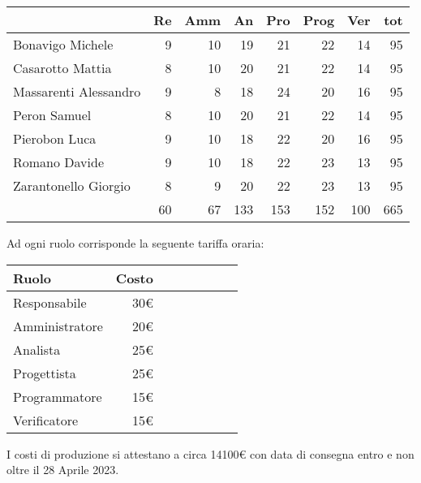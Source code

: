\begin{table}[H]
    \begin{tabularx}{\linewidth}{X|rrrrrrr}
    \rowcolor{gray!30}& Re & Amm & An & Pro & Prog & Ver & tot \\
    \hline
    Bonavigo Michele                        & 9 & 10 & 19 & 21 & 22 & 14 & 95 \\
    \rowcolor{gray!10}Casarotto Mattia      & 8 & 10 & 20 & 21 & 22 & 14 & 95 \\
    Massarenti Alessandro                   & 9 & 8 & 18 & 24 & 20 & 16 & 95 \\
    \rowcolor{gray!10}Peron Samuel          & 8 & 10 & 20 & 21 & 22 & 14 & 95 \\
    Pierobon Luca                           & 9 & 10 & 18 & 22 & 20 & 16 & 95 \\
    \rowcolor{gray!10}Romano Davide         & 9 & 10 & 18 & 22 & 23 & 13 & 95 \\
    Zarantonello Giorgio                    & 8 & 9 & 20 & 22 & 23 & 13 & 95 \\
    \hline                                  & 60 & 67 & 133 & 153 & 152 & 100 & 665 \\ 
    \end{tabularx}
\end{table}

Ad ogni ruolo corrisponde la seguente tariffa oraria:

\begin{table}[H]
    \begin{tabularx}{\linewidth}{X|rrrrrrr}
    \rowcolor{gray!30}Ruolo & Costo \\
    \hline
    Responsabile                       & 30€ \\
    \rowcolor{gray!10}Amministratore   & 20€ \\
    Analista                           & 25€ \\
    \rowcolor{gray!10}Progettista       & 25€ \\
    Programmatore                       & 15€ \\
    \rowcolor{gray!10}Verificatore      & 15€ \\
    \hline
    \end{tabularx}
\end{table}

I costi di produzione si attestano a circa 14100€ con data di consegna entro e non oltre il 28 Aprile 2023.












